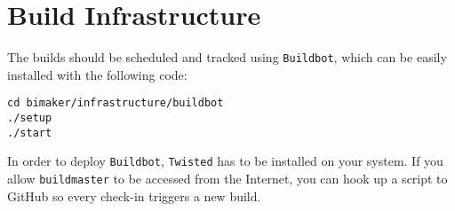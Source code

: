 \documentclass[a4paper,oneside]{article}
\begin{document}
\section{Build Infrastructure}
The builds should be scheduled and tracked using \texttt{Buildbot}, which can be easily installed with the following code:
    \begin{lstlisting}
cd bimaker/infrastructure/buildbot
./setup
./start
    \end{lstlisting}
In order to deploy \texttt{Buildbot}, \texttt{Twisted} has to be installed on your system. If you allow \texttt{buildmaster} to be accessed from the Internet, you can hook up a script to GitHub so every check-in triggers a new build.
\end{document}
